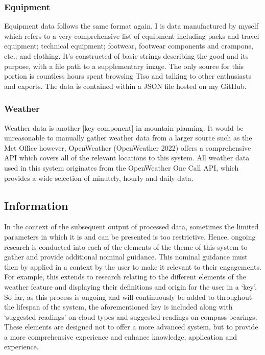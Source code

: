 \documentclass[11pt, english]{article}
\begin{document}
		\subsubsection{Equipment}

	Equipment data follows the same format again. I is data manufactured by myself which refers to a very comprehensive list of equipment including packs and travel equipment; technical equipment; footwear, footwear components and crampons, etc.; and clothing. It's constructed of basic strings describing the good and its purpose, with a file path to a supplementary image. The only source for this portion is countless hours spent browsing Tiso and talking to other enthusiasts and experts. The data is contained within a JSON file hosted on my GitHub.

		\subsubsection{Weather}

	Weather data is another [key component] in mountain planning. It would be unreasonable to manually gather weather data from a larger source such as the Met Office however, OpenWeather (OpenWeather 2022) offers a comprehensive API which covers all of the relevant locations to this system. All weather data used in this system originates from the OpenWeather One Call API, which provides a wide selection of minutely, hourly and daily data.

	\subsection{Information}

	In the context of the subsequent output of processed data, sometimes the limited parameters in which it is and can be presented is too restrictive. Hence, ongoing research is conducted into each of the elements of the theme of this system to gather and provide additional nominal guidance. This nominal guidance must then by applied in a context by the user to make it relevant to their engagements. For example, this extends to research relating to the different elements of the weather feature and displaying their definitions and origin for the user in a `key'. So far, as this process is ongoing and will continuously be added to throughout the lifespan of the system, the aforementioned key is included along with `suggested readings' on cloud types and suggested readings on compass bearings. These elements are designed not to offer a more advanced system, but to provide a more comprehensive experience and enhance knowledge, application and experience.
\end{document}
